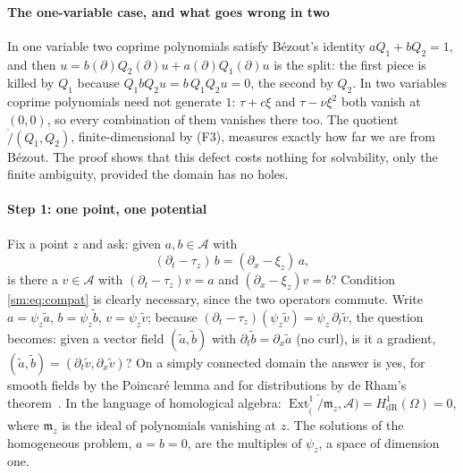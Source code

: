 \paragraph{The one-variable case, and what goes wrong in two} In one variable two coprime polynomials satisfy B\'ezout's
identity $aQ_1+bQ_2=1$, and then $u=b(\partial)Q_2(\partial)u+a(\partial)Q_1(\partial)u$ is the split: the first piece is
killed by $Q_1$ because $Q_1bQ_2u=b\,Q_1Q_2u=0$, the second by $Q_2$. In two variables coprime polynomials need not
generate $1$: $\tau+c\xi$ and $\tau-\nu\xi^2$ both vanish at $(0,0)$, so every combination of them vanishes there too.
The quotient $\ring/(Q_1,Q_2)$, finite-dimensional by (F3), measures exactly how far we are from B\'ezout. The proof shows
that this defect costs nothing for solvability, only the finite ambiguity, provided the domain has no holes.

\paragraph{Step 1: one point, one potential} Fix a point $z$ and ask: given $a,b\in\mathcal A$ with
\begin{equation}\label{sm:eq:compat}
  (\partial_t-\tau_z)\,b=(\partial_x-\xi_z)\,a ,
\end{equation}
is there a $v\in\mathcal A$ with $(\partial_t-\tau_z)v=a$ and $(\partial_x-\xi_z)v=b$? Condition \eqref{sm:eq:compat} is
clearly necessary, since the two operators commute. Write $a=\psi_z\tilde a$, $b=\psi_z\tilde b$, $v=\psi_z\tilde v$; because
$(\partial_t-\tau_z)(\psi_z\tilde v)=\psi_z\,\partial_t\tilde v$, the question becomes: given a vector field
$(\tilde a,\tilde b)$ with $\partial_t\tilde b=\partial_x\tilde a$ (no curl), is it a gradient,
$(\tilde a,\tilde b)=(\partial_t\tilde v,\partial_x\tilde v)$? On a simply connected domain the answer is yes, for smooth
fields by the Poincar\'e lemma and for distributions by de Rham's theorem~\cite{Rha55}. In the language of homological
algebra: $\operatorname{Ext}^1_\ring(\ring/\mathfrak m_z,\mathcal A)=H^1_{\mathrm{dR}}(\Omega)=0$, where $\mathfrak m_z$ is
the ideal of polynomials vanishing at $z$. The solutions of the homogeneous problem, $a=b=0$, are the multiples of
$\psi_z$, a space of dimension one.

